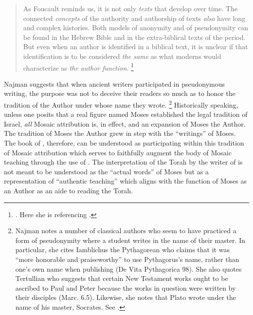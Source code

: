 \begin{quote}
    As Foucault reminds us, it is not only \emph{texts} that develop over time. The connected \emph{concepts} of the authority and authorship of texts \emph{also} have long and complex histories. Both models of anonymity and of pseudonymity can be found in the Hebrew Bible and in the extra-biblical texts of the \secondtemple period. But even when an author is identified in a biblical text, it is unclear if that identification is to be considered \emph{the same} as what moderns would characterize as \emph{the author function}.%
        \footnote{%
            \cite[9--10]{najman2003}. Here she is referencing
            \cite[213]{foucault_essential-foucault_2}.}
\end{quote}
\noindent
Najman suggests that when ancient writers participated in pseudonymous writing, the purpose was not to deceive their readers so much as to honor the tradition of the Author under whose name they wrote.%
    \footnote{%
        Najman notes a number of classical authors who seem to have practiced a form of pseudonymity where a student writes in the name of their master. In particular, she cites Iamblichus the Pythagorean who claims that it was ``more honorable and praiseworthy'' to use Pythagorus's name, rather than one's own name when publishing (De Vita Pythagorica 98). She also quotes Tertullian who suggests that certain New Testament works ought to be ascribed to Paul and Peter because the works in question were written by their disciples (Marc. 6.5). Likewise, she notes that Plato wrote under the name of his master, Socrates. See \cite[13]{najman2003}.}
Historically speaking, unless one posits that a real figure named Moses established the legal tradition of Israel, \emph{all} Mosaic attribution is, in effect, \psgraphical and an expansion of Moses the Author. The tradition of Moses the Author grew in step with the ``writings'' of Moses. The book of \jub, therefore, can be understood as participating within this tradition of Mosaic attribution which serves to faithfully augment the body of Mosaic teaching through the use of \psy. The interpretation of the Torah by the writer of \jub is not meant to be understood as the ``actual words'' of Moses but as a representation of ``authentic teaching'' which aligns with the function of Moses as an Author as an aide to reading the Torah.\autocite[13]{najman2003}


